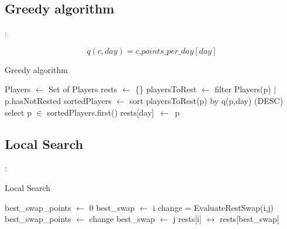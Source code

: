 \documentclass[9pt, aspectratio=169, xcolor=table]{beamer}
\begin{document}
\subsection{Greedy algorithm}
\begin{frame}{\secname: \subsecname}
\begin{tcolorbox}[colback=gray!30, colframe=Veronablue, arc=0pt, outer arc=0pt, title = \textbf{Greedy cost function}]
    \begin{equation*}
      q(c,day)= c.points\_per\_day[day]
    \end{equation*}
\end{tcolorbox}


\begin{algorithm}[H]
	\caption{Greedy algorithm} 
	\begin{algorithmic}[1]
	  \State Players $\leftarrow$ Set of Players
	  \State rests $\leftarrow$ \{\}
	      \State playersToRest $\leftarrow$ filter Players(p) $|$ p.hasNotRested
	    \State sortedPlayers $\leftarrow$ sort playersToRest(p) by q(p,day) (DESC) 
        \State select p $\in$ sortedPlayers.first()
	      \State rests[day]\ $\leftarrow$\ p
	    \EndFor
	\end{algorithmic} 
\end{algorithm}
\end{frame}

\subsection{Local Search}
\begin{frame}{\secname: \subsecname}
\begin{algorithm}[H]
	\caption{Local Search} 
	\begin{algorithmic}[1]
    \State best\_swap\_points $\leftarrow$ 0
    \State best\_swap $\leftarrow$ i
        \State change = EvaluateRestSwap(i,j)
          \State best\_swap\_points $\leftarrow$ change
          \State best\_swap $\leftarrow$ j
        \EndIf
      \EndFor
      \State rests[i] $\leftrightarrow$ rests[best\_swap]
		\EndFor
	\end{algorithmic} 
\end{algorithm}



\end{frame}
\end{document}
